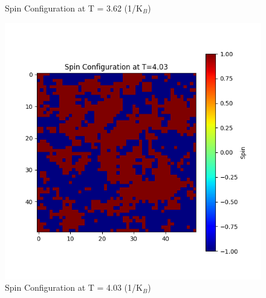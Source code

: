 \documentclass[11pt]{article}
\begin{document}
\begin{figure}[H]
\begin{minipage}{0.32\textwidth}
        \caption{Spin Configuration at T = 3.62 (1/K$_B$)}
        \label{fig:14}
    \end{minipage}
    \begin{minipage}{0.32\textwidth}
        \centering
        \includegraphics[width=\textwidth]{Spin_Configuration_at_T=4.03.png}
        \caption{Spin Configuration at T = 4.03 (1/K$_B$)}
        \label{fig:15}
    \end{minipage}\hfill
\end{figure}
\end{document}
